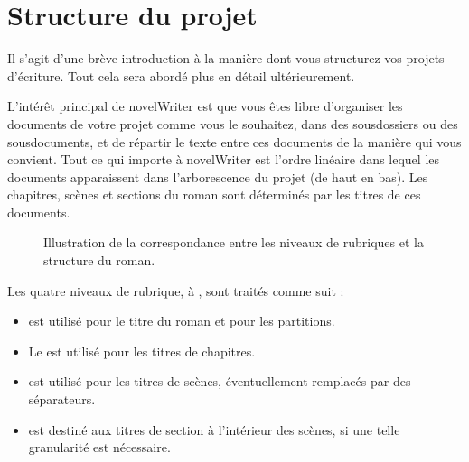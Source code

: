 \documentclass[a4paper,11pt,french]{sphinxmanual}
\begin{document}
\section{Structure du projet}
\label{\detokenize{usage_breakdown:project-layout}}\label{\detokenize{usage_breakdown:a-breakdown-project}}
\sphinxAtStartPar
Il s’agit d’une brève introduction à la manière dont vous structurez vos projets d’écriture. Tout cela sera abordé plus en détail ultérieurement.

\sphinxAtStartPar
L’intérêt principal de novelWriter est que vous êtes libre d’organiser les documents de votre projet comme vous le souhaitez, dans des sous\sphinxhyphen{}dossiers ou des sous\sphinxhyphen{}documents, et de répartir le texte entre ces documents de la manière qui vous convient. Tout ce qui importe à novelWriter est l’ordre linéaire dans lequel les documents apparaissent dans l’arborescence du projet (de haut en bas). Les chapitres, scènes et sections du roman sont déterminés par les titres de ces documents.

\begin{figure}[htbp]
\centering
\capstart

\noindent{}
\caption{Illustration de la correspondance entre les niveaux de rubriques et la structure du roman.}\label{\detokenize{usage_breakdown:id4}}\end{figure}

\sphinxAtStartPar
Les quatre niveaux de rubrique,  à , sont traités comme suit :
\begin{itemize}
\item {} 
\sphinxAtStartPar
{} est utilisé pour le titre du roman et pour les partitions.

\item {} 
\sphinxAtStartPar
Le  est utilisé pour les titres de chapitres.

\item {} 
\sphinxAtStartPar
{} est utilisé pour les titres de scènes, éventuellement remplacés par des séparateurs.

\item {} 
\sphinxAtStartPar
{} est destiné aux titres de section à l’intérieur des scènes, si une telle granularité est nécessaire.

\end{itemize}
\end{document}
